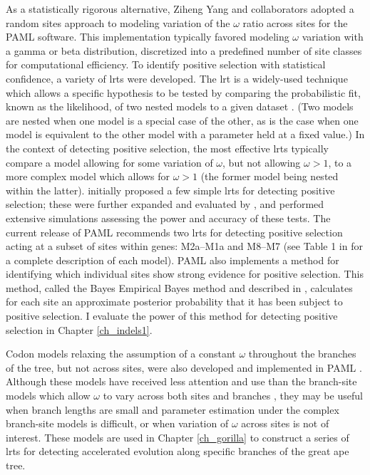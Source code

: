 As a statistically rigorous alternative, Ziheng Yang and collaborators
adopted a random sites approach to modeling variation of the $\omega$
ratio across sites for the PAML software. This implementation
typically favored modeling $\omega$ variation with a gamma or beta
distribution, discretized into a predefined number of site classes for
computational efficiency. To identify positive selection with
statistical confidence, a variety of \acp{lrt} were developed. The
\ac{lrt} is a widely-used technique which allows a specific hypothesis
to be tested by comparing the probabilistic fit, known as the
likelihood, of two nested models to a given dataset
\citep{Fisher1925}. (Two models are nested when one model is a special
case of the other, as is the case when one model is equivalent to the
other model with a parameter held at a fixed value.)  In the context
of detecting positive selection, the most effective \acp{lrt}
typically compare a model allowing for some variation of $\omega$, but
not allowing $\omega>1$, to a more complex model which allows for
$\omega>1$ (the former model being nested within the
latter). \citet{Nielsen1998} initially proposed a few simple \acp{lrt}
for detecting positive selection; these were further expanded and
evaluated by \citet{Yang2000CodonSubstitution}, and
\citet{Anisimova2001} performed extensive simulations assessing the
power and accuracy of these tests. The current release of PAML
recommends two \acp{lrt} for detecting positive selection acting at a
subset of sites within genes: \mbox{M2a--M1a} and \mbox{M8--M7} (see
Table 1 in \citet{Wong2004} for a complete description of each
model). PAML also implements a method for identifying which individual
sites show strong evidence for positive selection. This method, called
the Bayes Empirical Bayes method and described in
\citet{Yang2005Bayes}, calculates for each site an approximate
posterior probability that it has been subject to positive
selection. I evaluate the power of this method for detecting \sw
positive selection in Chapter \ref{ch_indels1}.

Codon models relaxing the assumption of a constant $\omega$ throughout
the branches of the tree, but not across sites, were also developed
and implemented in PAML \citep{Yang1998,Yang1998a}. Although these
models have received less attention and use than the branch-site
models which allow $\omega$ to vary across both sites and branches
\citep{Zhang2005}, they may be useful when branch lengths are small
and parameter estimation under the complex branch-site models is
difficult, or when variation of $\omega$ across sites is not of
interest. These models are used in Chapter \ref{ch_gorilla} to
construct a series of \acp{lrt} for detecting accelerated evolution
along specific branches of the great ape tree.

